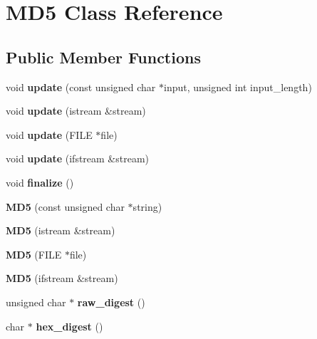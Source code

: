 \section{MD5 Class Reference}
\label{classMD5}
\subsection*{Public Member Functions}
\begin{DoxyCompactItemize}
\item 
void {\bfseries update} (const unsigned char $\ast$input, unsigned int input\_\-length)\label{classMD5_a15f269f3e39cd8b36a7fa6bf0459e619}

\item 
void {\bfseries update} (istream \&stream)\label{classMD5_ac1e228c5348da56a5fc47ea87b47f6c3}

\item 
void {\bfseries update} (FILE $\ast$file)\label{classMD5_a870b8675bca4d33b858d2b1abce9981a}

\item 
void {\bfseries update} (ifstream \&stream)\label{classMD5_a2b0e75c47f41e99830e2a00bbd2debf1}

\item 
void {\bfseries finalize} ()\label{classMD5_ade6a48e72d63710ab567cf473a3af0b0}

\item 
{\bfseries MD5} (const unsigned char $\ast$string)\label{classMD5_ab7e277b2ff74c25a9ef8af239e133701}

\item 
{\bfseries MD5} (istream \&stream)\label{classMD5_a78e603b5b35ab0d832a493a157ed89dc}

\item 
{\bfseries MD5} (FILE $\ast$file)\label{classMD5_a42be31aa712ef5450fad065ff7697f47}

\item 
{\bfseries MD5} (ifstream \&stream)\label{classMD5_a355a8e72bbb682375610be728b3b93a2}

\item 
unsigned char $\ast$ {\bfseries raw\_\-digest} ()\label{classMD5_aaf526d077ce13986854ee6223adaad5b}

\item 
char $\ast$ {\bfseries hex\_\-digest} ()\label{classMD5_a0d2767cc5ea3ce59c80e28ae64497d7e}

\end{DoxyCompactItemize}
